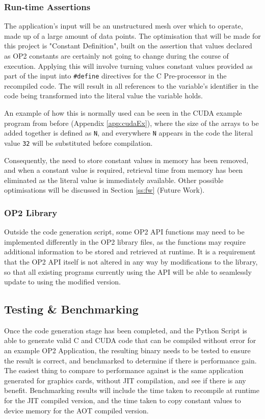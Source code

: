 \subsubsection{Run-time Assertions}
The application's input will be an unstructured mesh over which to operate, made up of a large amount of data points. The optimisation that will be made for this project is "Constant Definition", built on the assertion that values declared as OP2 constants are certainly not going to change during the course of execution. Applying this will involve turning values constant values provided as part of the input into \verb|#define| directives for the C Pre-processor in the recompiled code. The will result in all references to the variable's identifier in the code being transformed into the literal value the variable holds.
\par
An example of how this is normally used can be seen in the CUDA example program from before (Appendix \ref{app:cudaEx}), where the size of the arrays to be added together is defined as \verb|N|, and everywhere \verb|N| appears in the code the literal value \verb|32| will be substituted before compilation.
\par
Consequently, the need to store constant values in memory has been removed, and when a constant value is required, retrieval time from memory has been eliminated as the literal value is immediately available. Other possible optimisations will be discussed in Section \ref{ss:fw} (Future Work).

\subsubsection{OP2 Library}
Outside the code generation script, some OP2 API functions may need to be implemented differently in the OP2 library files, as the functions may require additional information to be stored and retrieved at runtime. It is a requirement that the OP2 API itself is not altered in any way by modifications to the library, so that all existing programs currently using the API will be able to seamlessly update to using the modified version.

\subsection{Testing \& Benchmarking}
Once the code generation stage has been completed, and the Python Script is able to generate valid C and CUDA code that can be compiled without error for an example OP2 Application, the resulting binary needs to be tested to ensure the result is correct, and benchmarked to determine if there is performance gain. The easiest thing to compare to performance against is the same application generated for graphics cards, without JIT compilation, and see if there is any benefit. Benchmarking results will include the time taken to recompile at runtime for the JIT compiled version, and the time taken to copy constant values to device memory for the AOT compiled version.

